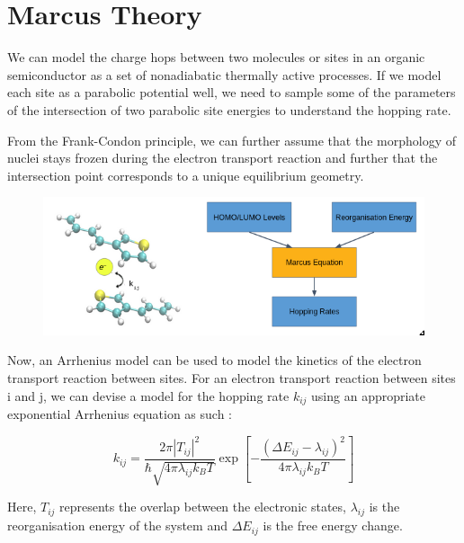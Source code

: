 \documentclass{article}
\begin{document}
\section{Marcus Theory}


We can model the charge hops between two molecules or sites in an organic semiconductor as a set of nonadiabatic thermally active processes. If we model each site as a parabolic potential well, we need to sample some of the parameters of the intersection of two parabolic site energies to understand the hopping rate.

From the Frank-Condon principle, we can further assume that the morphology of nuclei stays frozen during the electron transport reaction and further that the intersection point corresponds to a unique equilibrium geometry.

\begin{figure}

    \centering
    \includegraphics[scale=0.6]{fig3}

\end{figure}


Now, an Arrhenius model can be used to model the kinetics of the electron transport reaction between sites. For an electron transport reaction between sites i and j, we can devise a model for the hopping rate $k_{ij}$ using an appropriate exponential Arrhenius equation as such :

$$k_{ij} = \frac{2 \pi |T_{ij}|^2}{\hbar \sqrt{4 \pi \lambda_{ij} k_{B} T}} \exp\left[-\frac{(\Delta E_{ij} - \lambda_{ij})^2}{4 \pi \lambda_{ij} k_{B} T}\right]$$

Here, $T_{ij}$ represents the overlap between the electronic states, $\lambda_{ij}$ is the reorganisation energy of the system and $\Delta E_{ij}$ is the free energy change.

\end{document}

